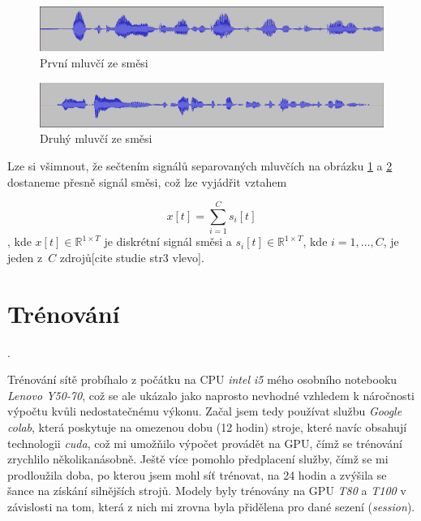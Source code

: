 \begin{figure}[H]
    \centering
    \includegraphics[scale=0.35]{obrazky-figures/dataset-s1.png}
    \caption{\label{fig:ref-s1}První mluvčí ze směsi}
\end{figure}

\begin{figure}[H]
    \centering
    \includegraphics[scale=0.35]{obrazky-figures/dataset-s2.png}
    \caption{\label{fig:ref-s2}Druhý mluvčí ze směsi}
\end{figure}

Lze si všimnout, že sečtením signálů separovaných mluvčích na obrázku \ref{fig:ref-s1} a \ref{fig:ref-s2} dostaneme přesně signál směsi, což lze vyjádřit vztahem

\begin{equation}
  x[t] = \sum_{i=1}^C s_i[t]
\end{equation}
, kde $x[t] \in \mathbb{R}^{1 \times T}$ je diskrétní signál směsi a $s_i[t] \in \mathbb{R}^{1 \times T}$, kde $i = 1,\ldots,C$, je jeden z~$C$ zdrojů[cite studie str3 vlevo]. 





\section{Trénování}
.

Trénování sítě probíhalo z počátku na CPU \textit{intel i5} mého osobního notebooku \textit{Lenovo Y50-70}, což se ale ukázalo jako naprosto nevhodné vzhledem k náročnosti výpočtu kvůli nedostatečnému výkonu. Začal jsem tedy používat službu \textit{Google colab}, která poskytuje na omezenou dobu (12 hodin) stroje, které navíc obsahují technologii \textit{cuda}, což mi umožňilo výpočet provádět na GPU, čímž se trénování zrychlilo několikanásobně. Ještě více pomohlo předplacení služby, čímž se mi prodloužila doba, po kterou jsem mohl síť trénovat, na 24 hodin a zvýšila se šance na získání silnějších strojů. Modely byly trénovány na GPU \textit{T80} a \textit{T100} v závislosti na tom, která z nich mi zrovna byla přidělena pro dané sezení (\textit{session}). 

